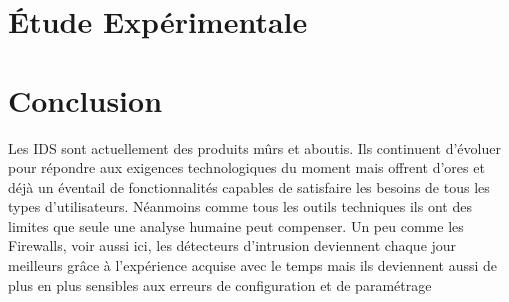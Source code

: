 \section{\'Etude Expérimentale}
\section{Conclusion}
Les IDS sont actuellement des produits mûrs et aboutis. Ils continuent d'évoluer pour répondre aux exigences technologiques du moment mais offrent d'ores et déjà un éventail de fonctionnalités capables de satisfaire les besoins de tous les types d'utilisateurs. Néanmoins comme tous les outils techniques ils ont des limites que seule une analyse humaine peut compenser. Un peu comme les Firewalls, voir aussi ici, les détecteurs d'intrusion deviennent chaque jour meilleurs grâce à l'expérience acquise avec le temps mais ils deviennent aussi de plus en plus sensibles aux erreurs de configuration et de paramétrage

